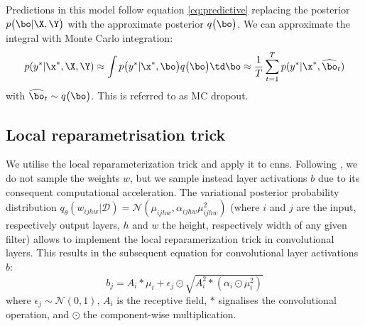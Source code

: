Predictions in this model follow equation \eqref{eq:predictive} replacing the posterior $p \big( \bo| \X, \Y \big)$ with the approximate posterior $q \big( \bo \big)$. We can approximate the integral with Monte Carlo integration:
\begin{align} \label{eq:approx_predictive}
p(y^* | \x^*, \X, \Y) \approx 
\int p \big( y^* | \x^*, \bo \big) q \big( \bo \big) 
\td \bo
\approx \frac{1}{T} \sum_{t=1}^T p ( y^* | \x^*, \widehat{\bo}_t )
\end{align}
with $\widehat{\bo}_t \sim q \big( \bo \big)$. This is referred to as MC dropout.

\subsection{Local  reparametrisation  trick}

We utilise the local reparameterization trick \cite{kingma2015variational} and apply it to \acp{cnn}. Following \cite{kingma2015variational,neklyudov2018variance}, we do not sample the weights $w$, but we sample instead layer activations $b$ due to its consequent computational acceleration. The variational posterior probability distribution $q_{\theta}(w_{ijhw}|\mathcal{D})=\mathcal{N}(\mu_{ijhw},\alpha_{ijhw}\mu^2_{ijhw})$ (where $i$ and $j$ are the input, respectively output layers, $h$ and $w$ the height, respectively width of any given filter) allows to implement the local reparamerization trick in convolutional layers. This results in the subsequent equation for convolutional layer activations $b$:
\begin{equation}
    b_j=A_i\ast \mu_i+\epsilon_j\odot \sqrt{A^2_i\ast (\alpha_i\odot \mu^2_i)}
\end{equation}
where $\epsilon_j \sim \mathcal{N}(0,1)$, $A_i$ is the receptive field, $\ast$ signalises the convolutional operation, and $\odot$ the component-wise multiplication.

